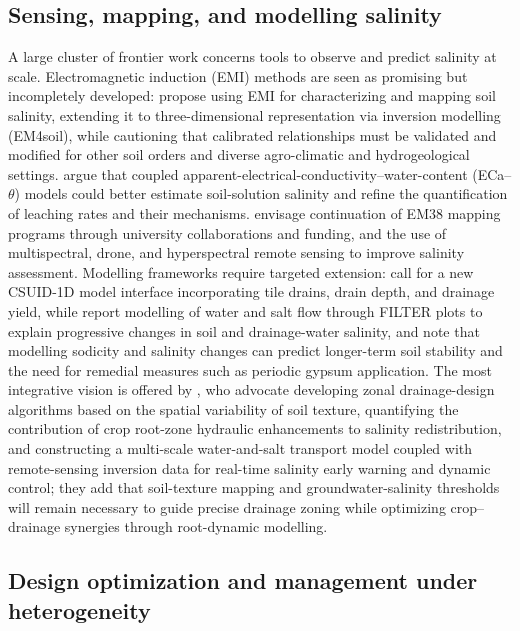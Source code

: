 \documentclass[11pt]{article}
\begin{document}
\subsection{Sensing, mapping, and modelling salinity}

A large cluster of frontier work concerns tools to observe and predict salinity at scale. Electromagnetic induction (EMI) methods are seen as promising but incompletely developed: \textcite{Narjary2024} propose using EMI for characterizing and mapping soil salinity, extending it to three-dimensional representation via inversion modelling (EM4soil), while cautioning that calibrated relationships must be validated and modified for other soil orders and diverse agro-climatic and hydrogeological settings. \textcite{Yu2025} argue that coupled apparent-electrical-conductivity--water-content (ECa--$\theta$) models could better estimate soil-solution salinity and refine the quantification of leaching rates and their mechanisms. \textcite{Singh2020d} envisage continuation of EM38 mapping programs through university collaborations and funding, and the use of multispectral, drone, and hyperspectral remote sensing to improve salinity assessment. Modelling frameworks require targeted extension: \textcite{Singh2020d} call for a new CSUID-1D model interface incorporating tile drains, drain depth, and drainage yield, while \textcite{Jayawardane2001} report modelling of water and salt flow through FILTER plots to explain progressive changes in soil and drainage-water salinity, and note that modelling sodicity and salinity changes can predict longer-term soil stability and the need for remedial measures such as periodic gypsum application. The most integrative vision is offered by \textcite{Zhu2025b}, who advocate developing zonal drainage-design algorithms based on the spatial variability of soil texture, quantifying the contribution of crop root-zone hydraulic enhancements to salinity redistribution, and constructing a multi-scale water-and-salt transport model coupled with remote-sensing inversion data for real-time salinity early warning and dynamic control; they add that soil-texture mapping and groundwater-salinity thresholds will remain necessary to guide precise drainage zoning while optimizing crop--drainage synergies through root-dynamic modelling.

\subsection{Design optimization and management under heterogeneity}
\end{document}
